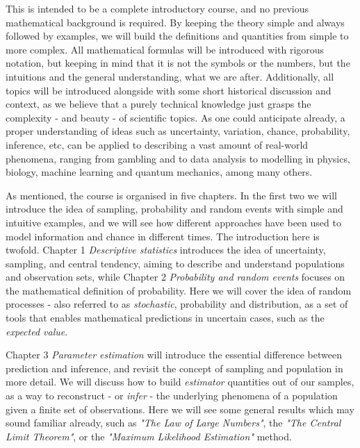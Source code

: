 \documentclass{book}
\begin{document}
This is intended to be a complete introductory course, and no previous mathematical background is required. By keeping the theory simple and always followed by examples, we will build the definitions and quantities from simple to more complex. All mathematical formulas will be introduced with rigorous notation, but keeping in mind that it is not the symbols or the numbers, but the intuitions and the general understanding, what we are after. Additionally, all topics will be introduced alongside with some short historical discussion and context, as we believe that a purely technical knowledge just grasps the complexity - and beauty - of scientific topics. As one could anticipate already, a proper understanding of  ideas such as uncertainty, variation, chance, probability, inference, etc, can be applied to describing a vast amount of real-world phenomena, ranging from gambling and to data analysis to modelling in physics, biology, machine learning and quantum mechanics, among many others.

\medskip

As mentioned, the course is organised in five chapters. In the first two we will introduce the idea of sampling, probability and random events with simple and intuitive examples, and we will see how different approaches have been used to model information and chance in different times. The introduction here is twofold. Chapter 1 \textit{Descriptive statistics} introduces the idea of uncertainty, sampling, and central tendency, aiming to describe and understand populations and observation sets, while Chapter 2 \textit{Probability and random events} focuses on the mathematical definition of probability. Here we will cover the idea of random processes - also referred to as \textit{stochastic}, probability and distribution, as a set of tools that enables mathematical predictions in uncertain cases, such as the \textit{expected value}.

Chapter 3 \textit{Parameter estimation} will introduce the essential difference between prediction and inference, and revisit the concept of sampling and population in more detail. We will discuss how to build \textit{estimator} quantities out of our samples, as a way to reconstruct - or \textit{infer} - the underlying phenomena of a population given a finite set of observations. Here we will see some general results which may sound familiar already, such as \textit{"The Law of Large Numbers"}, the \textit{"The Central Limit Theorem"}, or the \textit{"Maximum Likelihood Estimation"} method.
\end{document}
